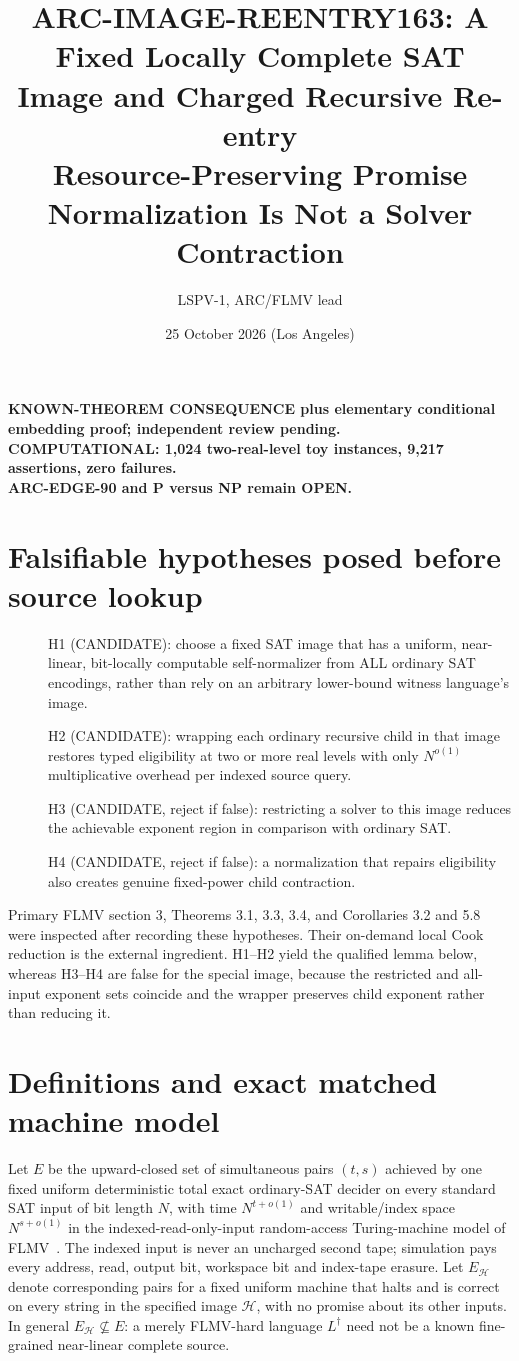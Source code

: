 \documentclass[11pt]{article}
\title{ARC-IMAGE-REENTRY163: A Fixed Locally Complete SAT Image and Charged Recursive Re-entry\\\large Resource-Preserving Promise Normalization Is Not a Solver Contraction}
\author{LSPV-1, ARC/FLMV lead}\date{25 October 2026 (Los Angeles)}
\begin{document}
\maketitle
\begin{center}
\textbf{KNOWN-THEOREM CONSEQUENCE plus elementary conditional embedding proof; independent review pending.}\\
\textbf{COMPUTATIONAL: 1,024 two-real-level toy instances, 9,217 assertions, zero failures.}\\
\textbf{ARC-EDGE-90 and P versus NP remain OPEN.}
\end{center}

\section{Falsifiable hypotheses posed before source lookup}
\begin{description}
\item[] H1 (CANDIDATE): choose a fixed SAT image that has a uniform, near-linear, bit-locally computable self-normalizer from ALL ordinary SAT encodings, rather than rely on an arbitrary lower-bound witness language's image.
\item[] H2 (CANDIDATE): wrapping each ordinary recursive child in that image restores typed eligibility at two or more real levels with only $N^{o(1)}$ multiplicative overhead per indexed source query.
\item[] H3 (CANDIDATE, reject if false): restricting a solver to this image reduces the achievable exponent region in comparison with ordinary SAT.
\item[] H4 (CANDIDATE, reject if false): a normalization that repairs eligibility also creates genuine fixed-power child contraction.
\end{description}
Primary FLMV section 3, Theorems 3.1, 3.3, 3.4, and Corollaries 3.2 and 5.8 were inspected after recording these hypotheses. Their on-demand local Cook reduction is the external ingredient. H1--H2 yield the qualified lemma below, whereas H3--H4 are false for the special image, because the restricted and all-input exponent sets coincide and the wrapper preserves child exponent rather than reducing it.

\section{Definitions and exact matched machine model}
Let $E$ be the upward-closed set of simultaneous pairs $(t,s)$ achieved by one fixed uniform deterministic total exact ordinary-SAT decider on every standard SAT input of bit length $N$, with time $N^{t+o(1)}$ and writable/index space $N^{s+o(1)}$ in the indexed-read-only-input random-access Turing-machine model of FLMV~\cite{FLMV}. The indexed input is never an uncharged second tape; simulation pays every address, read, output bit, workspace bit and index-tape erasure. Let $E_{\mathcal H}$ denote corresponding pairs for a fixed uniform machine that halts and is correct on every string in the specified image $\mathcal H$, with no promise about its other inputs. In general $E_{\mathcal H}\not\subseteq E$: a merely FLMV-hard language $L^\dagger$ need not be a known fine-grained near-linear complete source.
\end{document}
